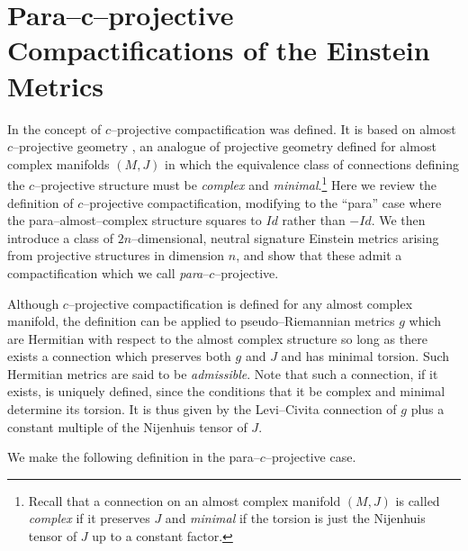 



\chapter{Para--c--projective Compactifications of the Einstein Metrics} \label{chap:c-proj}


In \cite{CG} the concept of $c$--projective compactification was
defined. It is based on almost $c$--projective geometry \cite{c_proj},
an analogue of projective geometry defined for almost complex
manifolds $(M,J)$ in which the equivalence class of connections
defining the $c$--projective structure must be \textit{complex} and
\textit{minimal}.\footnote{Recall that a connection on an almost
complex manifold $(M,J)$ is called \textit{complex} if it preserves $J$ and \textit{minimal} if the torsion is just the Nijenhuis tensor of $J$ up to a constant factor.} Here we review the definition of $c$--projective compactification, modifying to the ``para'' case where
the para--almost--complex structure squares to $Id$ rather than $-Id$. We
then introduce a class of $2n$--dimensional, neutral signature
Einstein metrics arising from projective structures in dimension $n$,
and show that these admit a compactification which we call
\textit{para}--$c$--projective.

Although $c$--projective compactification is defined for any almost complex manifold, the definition can be applied to pseudo--Riemannian metrics $g$ which are Hermitian with respect to the almost complex structure so long as there exists a connection which preserves both $g$ and $J$ and has minimal torsion. Such Hermitian metrics are said to be \textit{admissible}.  Note that such a connection, if it exists, is uniquely defined, since the conditions that it be complex and minimal determine its torsion. It is thus given by the Levi--Civita connection of $g$ plus a constant multiple of the Nijenhuis tensor of $J$.

We make the following definition in the para--$c$--projective case.


